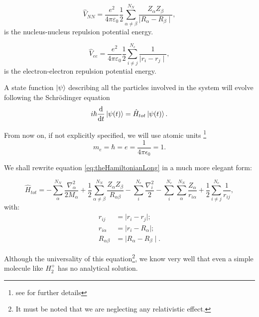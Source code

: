 \documentclass[a4paper,12pt]{article}
\begin{document}
\begin{equation}
\hat{V}_{NN} = \frac{e^2}{4\pi\varepsilon_{0}} \frac{1}{2} \sum_{\alpha \neq \beta}^{N_N} \frac{Z_{\alpha} Z_{\beta}}{\mid R_{\alpha} - R_{\beta} \mid },
\end{equation}
is the nucleus-nucleus repulsion potential energy.

\begin{equation}
\hat{V}_{ee} = \frac{e^2}{4\pi\varepsilon_{0}} \frac{1}{2} \sum_{i \neq j}^{N_e} \frac{1}{\mid r_{i} - r_{j} \mid },
\end{equation}
is the electron-electron repulsion potential energy.

A state function $\ket{\psi}$ describing all the particles involved in the system will evolve following the Schr\"odinger equation
\begin{equation}\label{eq:eq_sch}
	i\hbar\dv{t}\ket{\psi(t)} = \hat{H}_{tot}\ket{\psi(t)}.
\end{equation}

From now on, if not explicitly specified, we will use atomic units \footnote{see \cite[p.42]{Attila} for further details}
\begin{equation}
	m_{e} = \hbar = e =\frac{1}{4 \pi \epsilon_{0}} = 1.
\end{equation}

We shall rewrite equation \eqref{eq:theHamiltonianLong} in a much more elegant form:


\begin{equation}\label{eq:theHamiltonian}
\boxed{
	\hat{H}_{tot}   = - \sum_{\alpha}^{N_N} \frac{\nabla^2_{\alpha}}{2M_{\alpha}}
					+ \frac{1}{2}\sum_{\alpha \neq \beta}^{N_N} \frac{Z_{\alpha} Z_{\beta}} {R_{\alpha \beta}}
					- \sum_{i}^{N_e} \frac{\nabla_{i}^2}{2}
					- \sum_{i}^{N_e} \sum_{\alpha}^{N_N} \frac{ Z_{\alpha} }{r_{i \alpha}}				
					+ \frac{1}{2} \sum_{i \neq j}^{N_e} \frac{1}{r_{ij}}
,}
\end{equation}
with:
\begin{align*}
	r_{ij} & = \mid r_{i} - r_{j} \mid ;
\\
	r_{i \alpha} & = \mid r_{i} - R_{\alpha} \mid ;
\\
	R_{\alpha \beta} & = \mid R_{\alpha} - R_{\beta} \mid .
\end{align*}

Although the universality of this equation\footnote{It must be noted that we are neglecting any relativistic effect.}, we know very well that even a simple molecule like $H_2^{+}$ has no analytical solution.
\end{document}
